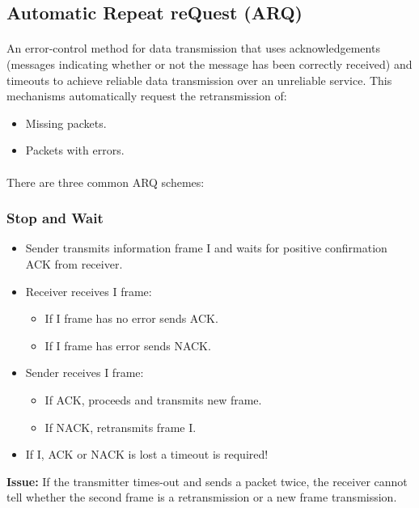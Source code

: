 \documentclass[../resumosRCOM.tex]{subfiles}
\begin{document}
\subsection{Automatic Repeat reQuest (ARQ)}
\paragraph{}
An error-control method for data transmission that uses acknowledgements
(messages indicating whether or not the message has been correctly received)
and timeouts to achieve reliable data transmission over an unreliable service.
This mechanisms automatically request the retransmission of:
\begin{itemize}
    \item Missing packets.
    \item Packets with errors.
\end{itemize}

\paragraph{}
There are three common ARQ schemes:

\subsubsection{Stop and Wait}
\begin{itemize}
    \item  Sender transmits information frame I and waits for positive confirmation
    ACK from receiver.
    \item Receiver receives I frame:
    \begin{itemize}
        \item If I frame has no error sends ACK.
        \item If I frame has error sends NACK.
    \end{itemize}
    \item Sender receives I frame:
    \begin{itemize}
        \item If ACK, proceeds and transmits new frame.
        \item If NACK, retransmits frame I.
    \end{itemize} 
    \item If I, ACK or NACK is lost a timeout is required!
\end{itemize}

\textbf{Issue:}
If the transmitter times-out and sends a packet twice, the receiver cannot tell 
whether the second frame is a retransmission or a new frame transmission.
\end{document}

